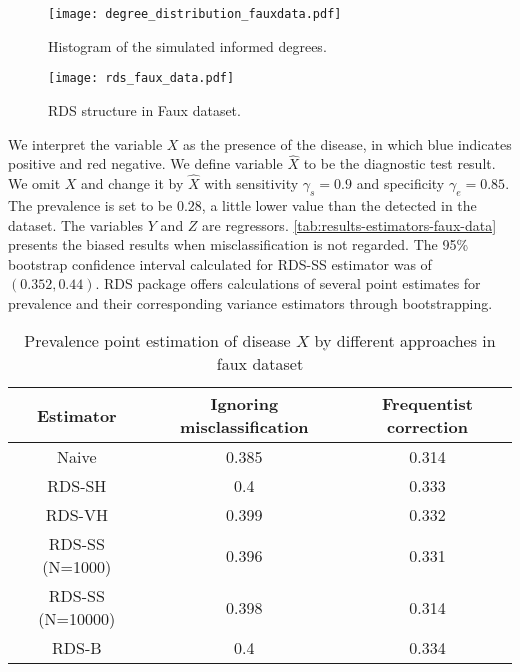\begin{figure}[htbp]
    \centering
    \caption{\label{fig:degre_distribution_fauxdata}Histogram of the simulated 
    informed degrees.}
    \texttt{[image: degree\_distribution\_fauxdata.pdf]}
\end{figure}

\begin{figure}[htb]
    \centering
    \caption{\label{fig:rds_faux_data}RDS structure in 
      Faux dataset.}
    \texttt{[image: rds\_faux\_data.pdf]}
  \end{figure}

We interpret the variable $X$ as the presence of the disease, in
which blue indicates positive and red negative. We define variable $\hat{X}$
to be the diagnostic test result. We omit $X$ and change it by $\hat{X}$ with sensitivity $\gamma_s = 0.9$ and specificity $\gamma_e =
0.85$. The prevalence is set to be $0.28$, a little
lower value than the detected in the dataset. The variables $Y$ and $Z$ are
regressors. \autoref{tab:results-estimators-faux-data} presents the biased
results when misclassification is not regarded. The 95\% bootstrap confidence interval
calculated for RDS-SS estimator was of $(0.352, 0.44)$. RDS package offers
calculations of several point estimates for prevalence and their corresponding
variance estimators through bootstrapping. 

\begin{table}[htb]
    \centering
    \caption{\label{tab:results-estimators-faux-data}Prevalence point estimation of
    disease $X$ by different approaches in faux dataset}
    \begin{tabular}{ccc}
    \hline
    Estimator & Ignoring misclassification & Frequentist correction \\ \hline
    Naive & 0.385 & 0.314 \\
    RDS-SH & 0.4 & 0.333 \\
    RDS-VH & 0.399 & 0.332 \\
    RDS-SS (N=1000) & 0.396 & 0.331 \\
    RDS-SS (N=10000) & 0.398 & 0.314 \\
    RDS-B & 0.4 & 0.334 \\ \hline
    \end{tabular}
\end{table}

